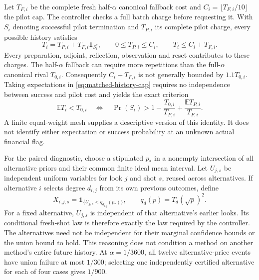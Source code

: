Let $T_{F,i}$ be the complete fresh half-$\alpha$ canonical fallback
cost and $C_i=\lfloor T_{F,i}/10\rfloor$ the pilot cap. The controller
checks a full batch charge before requesting it. With $S_i$ denoting
successful pilot termination and $T_{P,i}$ its complete pilot charge,
every possible history satisfies
\begin{equation}
 T_i=T_{P,i}+T_{F,i}\mathbf1_{S_i^c},
 \qquad 0\leq T_{P,i}\leq C_i,
 \qquad T_i\leq C_i+T_{F,i}.
 \label{eq:matched-history-cap}
\end{equation}
Every preparation, adjoint, reflection, observation and reset contributes
to these charges. The half-$\alpha$ fallback can require more repetitions
than the full-$\alpha$ canonical rival $T_{0,i}$. Consequently
$C_i+T_{F,i}$ is not generally bounded by $1.1T_{0,i}$.
Taking expectations in \eqref{eq:matched-history-cap} requires no
independence between success and pilot cost and yields the exact criterion
\begin{equation}
 \mathbb E T_i<T_{0,i}
 \quad\Longleftrightarrow\quad
 \Pr(S_i)>1-\frac{T_{0,i}}{T_{F,i}}
                 +\frac{\mathbb E T_{P,i}}{T_{F,i}}.
 \label{eq:matched-break-even}
\end{equation}
A finite equal-weight mesh supplies a descriptive version of this
identity. It does not identify either expectation or success probability
at an unknown actual financial flag.

For the paired diagnostic, choose a stipulated $p_*$ in a nonempty
intersection of all alternative priors and their common finite ideal
mean interval. Let $U_{j,s}$ be independent uniform variables for
look $j$ and shot $s$, reused across alternatives. If alternative $i$
selects degree $d_{i,j}$ from its own previous outcomes, define
\begin{equation}
 X_{i,j,s}=\mathbf1_{\{U_{j,s}<q_{d_{i,j}}(p_*)\}},
 \qquad
 q_d(p)=T_d(\sqrt p)^2.
 \label{eq:matched-paired-uniforms}
\end{equation}
For a fixed alternative, $U_{j,s}$ is independent of that alternative's
earlier looks. Its conditional fresh-shot law is therefore exactly the
law required by the controller. The alternatives need not be independent
for their marginal confidence bounds or the union bound to hold.
This reasoning does not condition a method on another method's entire
future history. At $\alpha=1/3600$, all twelve alternative-price
events have union failure at most $1/300$; selecting one independently
certified alternative for each of four cases gives $1/900$.

